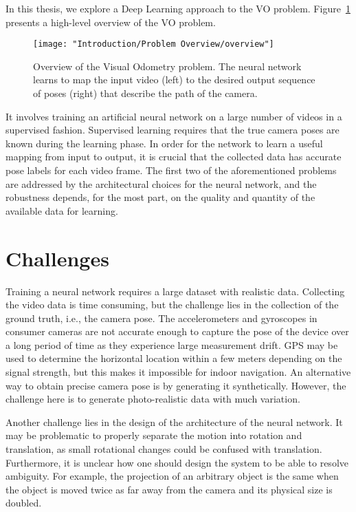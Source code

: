 		In this thesis, we explore a Deep Learning approach to the VO problem.
		Figure~\ref{fig:overview-visual-odometry} presents a high-level overview of the VO problem.
		\begin{figure}[t]
			\centering
			\texttt{[image: "Introduction/Problem Overview/overview"]}
			\caption[Description of the Visual Odometry problem]
					{Overview of the Visual Odometry problem.
					 The neural network learns to map the input video (left) to the desired output sequence of poses (right) that describe the path of the camera.
					 \label{fig:overview-visual-odometry}}
		\end{figure}
		It involves training an artificial neural network on a large number of videos in a supervised fashion.
		Supervised learning requires that the true camera poses are known during the learning phase.
		In order for the network to learn a useful mapping from input to output, it is crucial that the collected data has accurate pose labels for each video frame.
		The first two of the aforementioned problems are addressed by the architectural choices for the neural network, and the robustness depends, for the most part, on the quality and quantity of the available data for learning.
		
		
	\section{Challenges}
		
		Training a neural network requires a large dataset with realistic data.
		Collecting the video data is time consuming, but the challenge lies in the collection of the ground truth, i.e., the camera pose.
		The accelerometers and gyroscopes in consumer cameras are not accurate enough to capture the pose of the device over a long period of time as they experience large measurement drift.
		GPS may be used to determine the horizontal location within a few meters depending on the signal strength, but this makes it impossible for indoor navigation.
		An alternative way to obtain precise camera pose is by generating it synthetically.
		However, the challenge here is to generate photo-realistic data with much variation.
		
		Another challenge lies in the design of the architecture of the neural network.
		It may be problematic to properly separate the motion into rotation and translation, as small rotational changes could be confused with translation.
		Furthermore, it is unclear how one should design the system to be able to resolve ambiguity.
		For example, the projection of an arbitrary object is the same when the object is moved twice as far away from the camera and its physical size is doubled.
		
